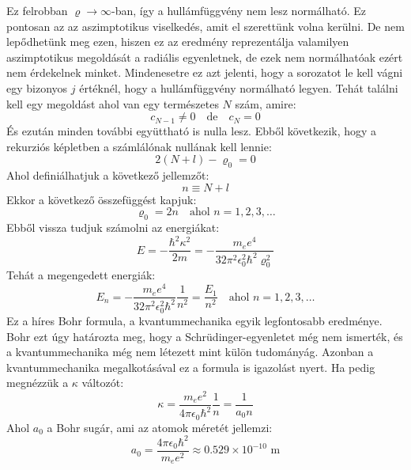 \documentclass[a4paper,12pt]{article}
\begin{document}
Ez felrobban $\varrho \to \infty$-ban, így a hullámfüggvény nem lesz normálható. Ez pontosan az az aszimptotikus viselkedés, amit el szerettünk volna kerülni.
De nem lepődhetünk meg ezen, hiszen ez az eredmény reprezentálja valamilyen aszimptotikus megoldását a radiális egyenletnek, de ezek nem normálhatóak ezért 
nem érdekelnek minket. Mindenesetre ez azt jelenti, hogy a sorozatot le kell vágni egy bizonyos $j$ értéknél, hogy a hullámfüggvény normálható legyen.
Tehát találni kell egy megoldást ahol van egy természetes $N$ szám, amire:
\begin{equation}
    c_{N - 1} \neq 0 \quad \text{de} \quad c_N = 0
\end{equation}
És ezután minden további együttható is nulla lesz. Ebből következik, hogy a rekurziós képletben a számlálónak nullának kell lennie:
\begin{equation}
    2(N + l) - \varrho_0 = 0
\end{equation}
Ahol definiálhatjuk a következő jellemzőt:
\begin{equation}
    n \equiv N + l
\end{equation}
Ekkor a következő összefüggést kapjuk:
\begin{equation}
    \varrho_0 = 2 n \quad \text{ahol } n = 1, 2, 3, \ldots
\end{equation}
Ebből vissza tudjuk számolni az energiákat:
\begin{equation}
    E = - \frac{\hbar^2 \kappa^2}{2m} = - \frac{m_e e^4}{32 \pi^2 \epsilon_0^2 \hbar^2 \varrho_0^2}
\end{equation}
Tehát a megengedett energiák:
\begin{equation}
    E_n = - \frac{m_e e^4}{32 \pi^2 \epsilon_0^2 \hbar^2} \frac{1}{n^2} = \frac{E_1}{n^2} \quad \text{ahol } n = 1, 2, 3, \ldots
\end{equation}
Ez a híres Bohr formula, a kvantummechanika egyik legfontosabb eredménye. Bohr ezt úgy határozta meg, hogy a Schrüdinger-egyenletet még nem ismerték,
és a kvantummechanika még nem létezett mint külön tudományág. Azonban a kvantummechanika megalkotásával ez a formula is igazolást nyert.
Ha pedig megnézzük a $\kappa$ változót:
\begin{equation}
    \kappa = \frac{m_e e^2}{4 \pi \epsilon_0 \hbar^2} \frac{1}{n} = \frac{1}{a_0 n}
\end{equation}
Ahol $a_0$ a Bohr sugár, ami az atomok méretét jellemzi:
\begin{equation}
    a_0 = \frac{4 \pi \epsilon_0 \hbar^2}{m_e e^2} \approx 0.529 \times 10^{-10} \text{ m}
\end{equation}
\end{document}
